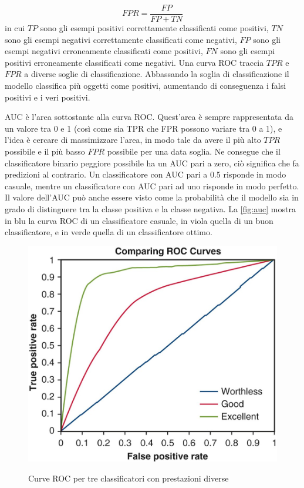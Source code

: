 \documentclass[12pt,italian]{report}
\begin{document}
$$
FPR = \frac{FP}{FP+TN}
$$
in cui $TP$ sono gli esempi positivi correttamente classificati come positivi, $TN$ sono gli esempi negativi correttamente classificati come negativi, $FP$ sono gli esempi negativi erroneamente classificati come positivi, $FN$ sono gli esempi positivi erroneamente classificati come negativi. Una curva ROC traccia $TPR$ e $FPR$ a diverse soglie di classificazione. Abbassando la soglia di classificazione il modello classifica più oggetti come positivi, aumentando di conseguenza i falsi positivi e i veri positivi. 

AUC è l'area sottostante alla curva ROC. Quest'area è sempre rappresentata da un valore tra 0 e 1 (così come sia TPR che FPR possono variare tra 0 a 1), e l'idea è cercare di massimizzare l'area, in modo tale da avere il più alto $TPR$ possibile e il più basso $FPR$ possibile per una data soglia. Ne consegue che il classificatore binario peggiore possibile ha un AUC pari a zero, ciò significa che fa predizioni al contrario. Un classificatore con AUC pari a 0.5 risponde in modo casuale, mentre un classificatore con AUC pari ad uno risponde in modo perfetto. Il valore dell'AUC può anche essere visto come la probabilità che il modello sia in grado di distinguere tra la classe positiva e la classe negativa. La \autoref{fig:auc} mostra in blu la curva ROC di un classificatore casuale, in viola quella di un buon classificatore, e in verde quella di un classificatore ottimo. 

\begin{figure}
  \centering
  \includegraphics[scale=0.60]{immagini/AUC.jpg}
  \caption{Curve ROC per tre classificatori con prestazioni diverse}
  \cite{auc-picture}
  \label{fig:auc}
\end{figure}
\end{document}
